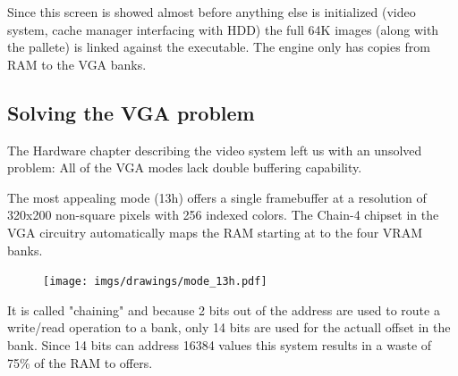 \documentclass[book.tex]{subfiles}
\begin{document}
\par 
\begin{minipage}{\textwidth}

\end{minipage}
Since this screen is showed almost before anything else is initialized (video system, cache manager interfacing with HDD) the full 64K images (along with the pallete) is linked against the executable. The engine only has copies from RAM to the VGA banks.\\
\par
{}




















\subsection{Solving the VGA problem}
The Hardware chapter describing the video system left us with an unsolved problem: All of the VGA modes lack double buffering capability.\\
\par
 The most appealing mode (13h) offers a single framebuffer at a resolution of 320x200 non-square pixels with 256 indexed colors. The Chain-4 chipset in the VGA circuitry automatically maps the RAM starting at  to the four VRAM banks. 
 \par
 \begin{figure}[H]
\centering
      \texttt{[image: imgs/drawings/mode\_13h.pdf]}
\end{figure}

It is called "chaining" and because 2 bits out of the address are used to route a write/read operation to a bank, only 14 bits are used for the actuall offset in the bank. Since 14 bits can address 16384 values this system results in a waste of 75\% of the RAM to offers.\\
\end{document}
